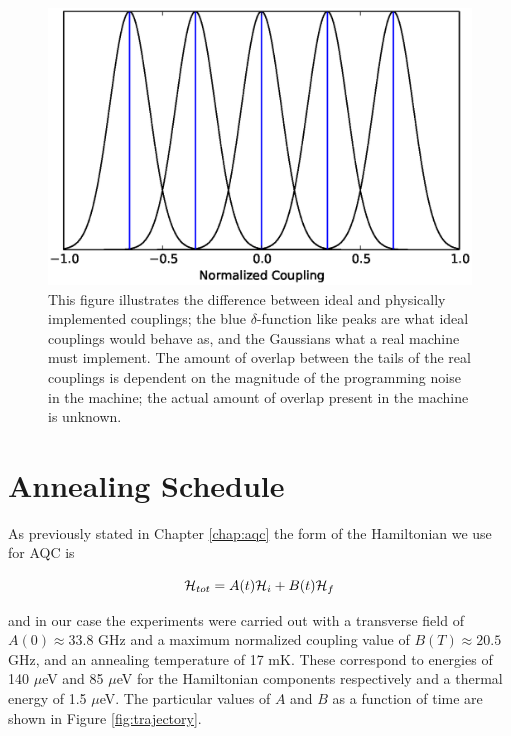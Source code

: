 \begin{figure}
	\includegraphics{img/coupling_spread.eps}
	\caption[Ideal vs. Physical Couplings]{This figure illustrates the difference between ideal and physically implemented couplings; the blue $\delta$-function like peaks are what ideal couplings would behave as, and the Gaussians what a real machine must implement.  The amount of overlap between the tails of the real couplings is dependent on the magnitude of the programming noise in the machine; the actual amount of overlap present in the \machine machine is unknown.}
	\label{fig:coupling_spread}
\end{figure}

\section{Annealing Schedule}
As previously stated in Chapter \ref{chap:aqc} the form of the Hamiltonian we use for AQC is

\begin{equation}
	\mathcal{H}_{tot} = A(t)\mathcal{H}_i + B(t)\mathcal{H}_f
\end{equation}

and in our case the experiments were carried out with a transverse field of $A(0) \approx 33.8 $ GHz and a maximum normalized coupling value of $B(T) \approx 20.5$ GHz, and an annealing temperature of 17 mK.  These correspond to energies of 140 $\mu$eV and 85 $\mu$eV for the Hamiltonian components respectively and a thermal energy of 1.5 $\mu$eV.  The particular values of $A$ and $B$ as a function of time are shown in Figure \ref{fig:trajectory}.

